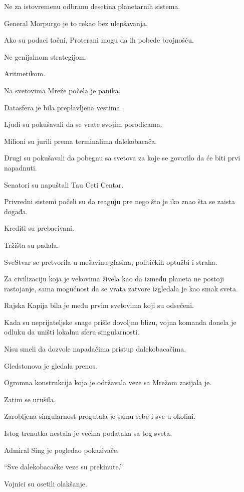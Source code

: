 Ne za istovremenu odbranu desetina planetarnih sistema.

General Morpurgo je to rekao bez ulepšavanja.

Ako su podaci tačni, Proterani mogu da ih pobede brojnošću.

Ne genijalnom strategijom.

Aritmetikom.

\bigskip

Na svetovima Mreže počela je panika.

Datasfera je bila preplavljena vestima.

Ljudi su pokušavali da se vrate svojim porodicama.

Milioni su jurili prema terminalima dalekobacača.

Drugi su pokušavali da pobegnu sa svetova za koje se govorilo da će biti prvi napadnuti.

Senatori su napuštali Tau Ceti Centar.

Privredni sistemi počeli su da reaguju pre nego što je iko znao šta se zaista događa.

Krediti su prebacivani.

Tržišta su padala.

SveStvar se pretvorila u mešavinu glasina, političkih optužbi i straha.

Za civilizaciju koja je vekovima živela kao da između planeta ne postoji rastojanje, sama mogućnost da se vrata zatvore izgledala je kao smak sveta.

\bigskip

Rajska Kapija bila je među prvim svetovima koji su odsečeni.

Kada su neprijateljske snage prišle dovoljno blizu, vojna komanda donela je odluku da uništi lokalnu sferu singularnosti.

Nisu smeli da dozvole napadačima pristup dalekobacačima.

Gledstonova je gledala prenos.

Ogromna konstrukcija koja je održavala veze sa Mrežom zasijala je.

Zatim se urušila.

Zarobljena singularnost progutala je samu sebe i sve u okolini.

Istog trenutka nestala je većina podataka sa tog sveta.

Admiral Sing je pogledao pokazivače.

``Sve dalekobacačke veze su prekinute.''

Vojnici su osetili olakšanje.

